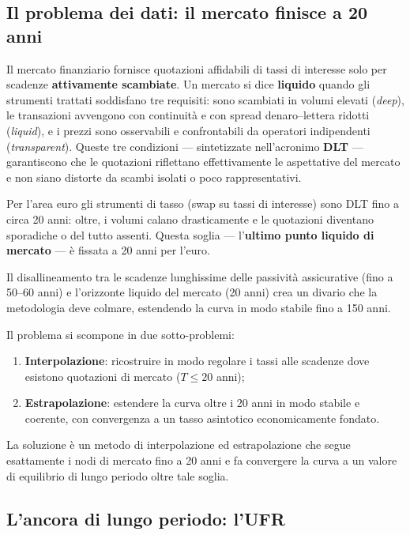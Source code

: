 \documentclass[11pt,a4paper]{article}
\theoremstyle{plain}
\theoremstyle{definition}
\theoremstyle{remark}
\begin{document}
\subsection{Il problema dei dati: il mercato finisce a 20 anni}

Il mercato finanziario fornisce quotazioni affidabili di tassi di interesse solo per scadenze
\textbf{attivamente scambiate}. Un mercato si dice \textbf{liquido} quando gli strumenti
trattati soddisfano tre requisiti: sono scambiati in volumi elevati (\emph{deep}), le
transazioni avvengono con continuità e con spread denaro--lettera ridotti (\emph{liquid}),
e i prezzi sono osservabili e confrontabili da operatori indipendenti (\emph{transparent}).
Queste tre condizioni --- sintetizzate nell'acronimo \textbf{DLT} --- garantiscono che le
quotazioni riflettano effettivamente le aspettative del mercato e non siano distorte da
scambi isolati o poco rappresentativi.

Per l'area euro gli strumenti di tasso (swap su tassi di interesse) sono DLT fino a
circa 20 anni: oltre, i volumi calano drasticamente e le quotazioni diventano sporadiche
o del tutto assenti. Questa soglia --- l'\textbf{ultimo punto liquido di mercato} --- \`e
fissata a 20 anni per l'euro.

Il disallineamento tra le scadenze lunghissime delle passivit\`a assicurative (fino a 50--60
anni) e l'orizzonte liquido del mercato (20 anni) crea un divario che la metodologia deve
colmare, estendendo la curva in modo stabile fino a 150 anni.

Il problema si scompone in due sotto-problemi:
\begin{enumerate}
  \item \textbf{Interpolazione}: ricostruire in modo regolare i tassi alle scadenze dove
        esistono quotazioni di mercato ($T \le 20$ anni);
  \item \textbf{Estrapolazione}: estendere la curva oltre i 20 anni in modo stabile e
        coerente, con convergenza a un tasso asintotico economicamente fondato.
\end{enumerate}

La soluzione \`e un metodo di interpolazione ed estrapolazione che segue esattamente i nodi
di mercato fino a 20 anni e fa convergere la curva a un valore di equilibrio di lungo periodo
oltre tale soglia.

\subsection{L'ancora di lungo periodo: l'UFR}
\end{document}
